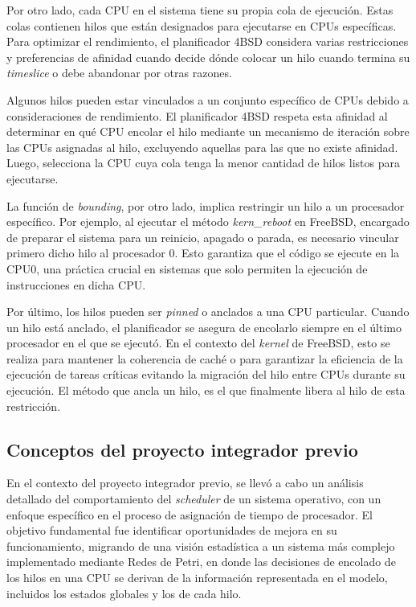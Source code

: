 Por otro lado, cada CPU en el sistema tiene su propia cola de ejecución. Estas colas contienen hilos que están designados para ejecutarse en CPUs específicas. Para optimizar el rendimiento, el planificador 4BSD considera varias restricciones y preferencias de afinidad cuando decide dónde colocar un hilo cuando termina su \textit{timeslice} o debe abandonar por otras razones.

Algunos hilos pueden estar vinculados a un conjunto específico de CPUs debido a consideraciones de rendimiento. El planificador 4BSD respeta esta afinidad al determinar en qué CPU encolar el hilo mediante un mecanismo de iteración sobre las CPUs asignadas al hilo, excluyendo aquellas para las que no existe afinidad. Luego, selecciona la CPU cuya cola tenga la menor cantidad de hilos listos para ejecutarse.\par

La función de \textit{bounding}, por otro lado, implica restringir un hilo a un procesador específico. Por ejemplo, al ejecutar el método \textit{kern\_reboot} en FreeBSD, encargado de preparar el sistema para un reinicio, apagado o parada, es necesario vincular primero dicho hilo al procesador 0. Esto garantiza que el código se ejecute en la CPU0, una práctica crucial en sistemas que solo permiten la ejecución de instrucciones en dicha CPU.\par

Por último, los hilos pueden ser \textit{pinned} o anclados a una CPU particular. Cuando un hilo está anclado, el planificador se asegura de encolarlo siempre en el último procesador en el que se ejecutó. En el contexto del \textit{kernel} de FreeBSD, esto se realiza para mantener la coherencia de caché o para garantizar la eficiencia de la ejecución de tareas críticas evitando la migración del hilo entre CPUs durante su ejecución. El método que ancla un hilo, es el que finalmente libera al hilo de esta restricción.\par

\subsection{Conceptos del proyecto integrador previo}

En el contexto del proyecto integrador previo, se llevó a cabo un análisis detallado del comportamiento del \textit{scheduler} de un sistema operativo, con un enfoque específico en el proceso de asignación de tiempo de procesador. El objetivo fundamental fue identificar oportunidades de mejora en su funcionamiento, migrando de una visión estadística a un sistema más complejo implementado mediante Redes de Petri, en donde las decisiones de encolado de los hilos en una CPU se derivan de la información representada en el modelo, incluidos los estados globales y los de cada hilo.\par

